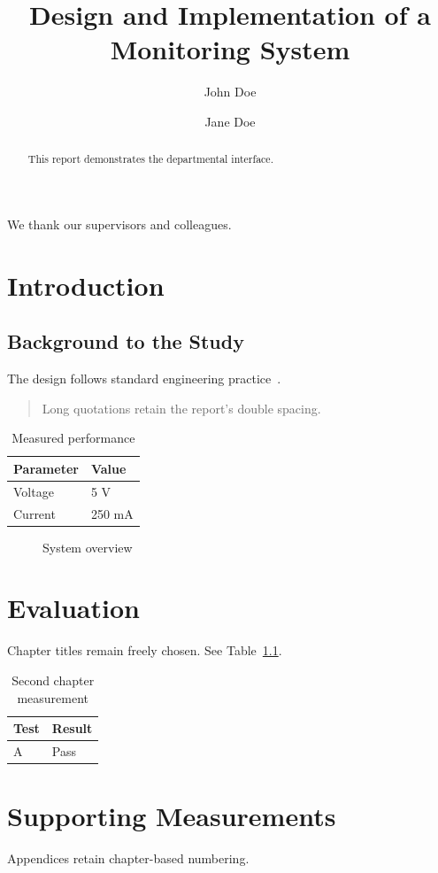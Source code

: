 \documentclass[eee-report]{otengineering}
\title{Design and Implementation of a Monitoring System}
\author{John Doe \and Jane Doe}
\begin{document}
\maketitle
\frontmatter
\begin{acknowledgements}We thank our supervisors and colleagues.\end{acknowledgements}
\reportlists
\begin{abstract}This report demonstrates the departmental interface.\end{abstract}
\mainmatter
\chapter{Introduction}
\section{Background to the Study}
The design follows standard engineering practice~\cite{sample}.
\begin{quote}Long quotations retain the report's double spacing.\end{quote}
\begin{table}[htbp]\centering
\caption{Measured performance}\label{tab:performance}
\begin{tabular}{ll}\toprule Parameter & Value\\\midrule
Voltage & 5 V\\ Current & 250 mA\\\bottomrule\end{tabular}
\end{table}
\begin{figure}[htbp]\centering{}
\caption{System overview}\label{fig:overview}\end{figure}
\begin{plate}[htbp]\centering{}
\caption{Completed prototype}\label{plate:prototype}\end{plate}
\chapter{Evaluation}
Chapter titles remain freely chosen. See Table~\ref{tab:performance}.
\begin{table}[htbp]\centering\caption{Second chapter measurement}
\begin{tabular}{ll}\toprule Test & Result\\\midrule A & Pass\\\bottomrule\end{tabular}\end{table}
\printbibliography
\appendix
\chapter{Supporting Measurements}
Appendices retain chapter-based numbering.
\end{document}
